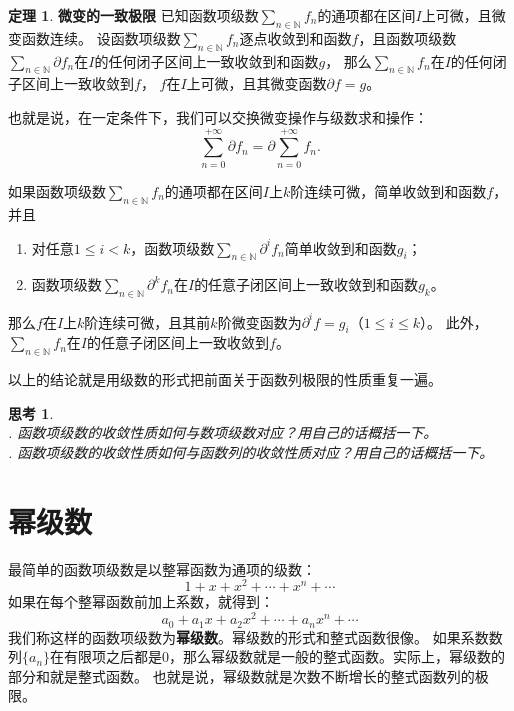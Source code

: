 \documentclass[12pt,UTF8]{ctexbook}
\theoremstyle{definition}
\newtheorem{tm}{定理}[section]
\theoremstyle{plain}
\newtheorem{sk}{思考}[section]
\begin{document}
\begin{tm}{\textbf{微变的一致极限}}
    已知函数项级数$\sum_{n\in\mathbb{N}} f_n$的通项都在区间$I$上可微，且微变函数连续。
    设函数项级数$\sum_{n\in\mathbb{N}} f_n$逐点收敛到和函数$f$，且函数项级数$\sum_{n\in\mathbb{N}} \partial f_n$在$I$的任何闭子区间上一致收敛到和函数$g$，
    那么$\sum_{n\in\mathbb{N}} f_n$在$I$的任何闭子区间上一致收敛到$f$，
    $f$在$I$上可微，且其微变函数$\partial f = g$。

    也就是说，在一定条件下，我们可以交换微变操作与级数求和操作：
    $$ \sum_{n=0}^{+\infty} \partial f_n = \partial \sum_{n=0}^{+\infty} f_n. $$
    
    如果函数项级数$\sum_{n\in\mathbb{N}} f_n$的通项都在区间$I$上$k$阶连续可微，简单收敛到和函数$f$，并且
    \begin{enumerate}
        \item 对任意$1 \leqslant i < k$，函数项级数$\sum_{n\in\mathbb{N}} \partial^i f_n$简单收敛到和函数$g_i$；
        \item 函数项级数$\sum_{n\in\mathbb{N}} \partial^k f_n$在$I$的任意子闭区间上一致收敛到和函数$g_k$。
    \end{enumerate}
    那么$f$在$I$上$k$阶连续可微，且其前$k$阶微变函数为$\partial^i f = g_i$（$1 \leqslant i\leqslant k$）。
    此外，$\sum_{n\in\mathbb{N}} f_n$在$I$的任意子闭区间上一致收敛到$f$。
\end{tm}

以上的结论就是用级数的形式把前面关于函数列极限的性质重复一遍。

\begin{sk}
    \mbox{} \\
    . 函数项级数的收敛性质如何与数项级数对应？用自己的话概括一下。\\
    . 函数项级数的收敛性质如何与函数列的收敛性质对应？用自己的话概括一下。
\end{sk}

\section{幂级数}

最简单的函数项级数是以整幂函数为通项的级数：
$$ 1 + x + x^2 + \cdots + x^n + \cdots$$
如果在每个整幂函数前加上系数，就得到：
$$ a_0 + a_1x + a_2x^2 + \cdots + a_n x^n + \cdots$$
我们称这样的函数项级数为\textbf{幂级数}。幂级数的形式和整式函数很像。
如果系数数列$\{a_n\}$在有限项之后都是$0$，那么幂级数就是一般的整式函数。实际上，幂级数的部分和就是整式函数。
也就是说，幂级数就是次数不断增长的整式函数列的极限。
\end{document}
